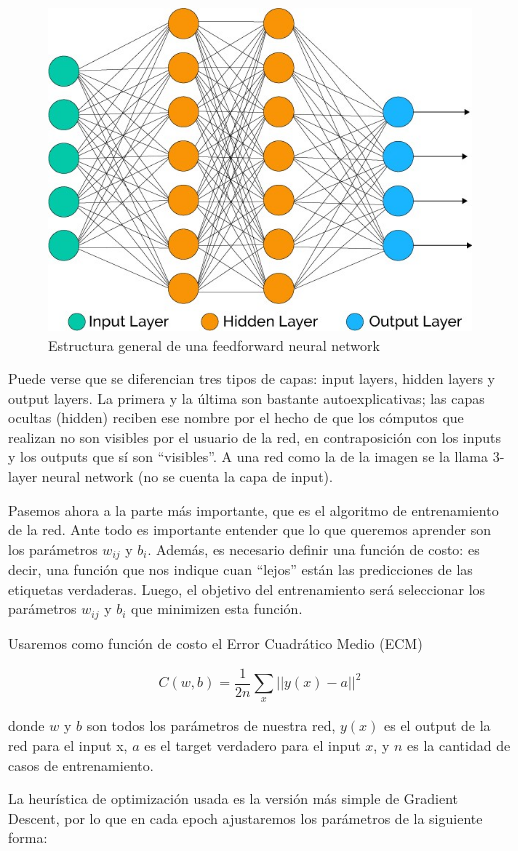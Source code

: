 \begin{figure}[H]
  \begin{center}  
    \includegraphics[width=0.7\linewidth]{imgs/multilayer_net.jpg}
  \end{center}
  \caption{Estructura general de una feedforward neural network}
  \label{fig:general_net}
\end{figure}

Puede verse que se diferencian tres tipos de capas: input layers, hidden layers y output layers. La primera y la última son bastante autoexplicativas; las capas ocultas (hidden) reciben ese nombre por el hecho de que los cómputos que realizan no son visibles por el usuario de la red, en contraposición con los inputs y los outputs que sí son ``visibles''. A una red como la de la imagen se la llama 3-layer neural network (no se cuenta la capa de input).

Pasemos ahora a la parte más importante, que es el algoritmo de entrenamiento de la red. Ante todo es importante entender que lo que queremos aprender son los parámetros $w_{ij}$ y $b_i$. Además, es necesario definir una función de costo: es decir, una función que nos indique cuan ``lejos'' están las predicciones de las etiquetas verdaderas. Luego, el objetivo del entrenamiento será seleccionar los parámetros $w_{ij}$ y $b_i$ que minimizen esta función.

Usaremos como función de costo el Error Cuadrático Medio (ECM)

$$C(w, b) = \frac{1}{2n}\sum_{x}{||y(x) - a||^2}$$

donde $w$ y $b$ son todos los parámetros de nuestra red, $y(x)$ es el output de la red para el input x, $a$ es el target verdadero para el input $x$, y $n$ es la cantidad de casos de entrenamiento.

La heurística de optimización usada es la versión más simple de Gradient Descent, por lo que en cada epoch ajustaremos los parámetros de la siguiente forma:

